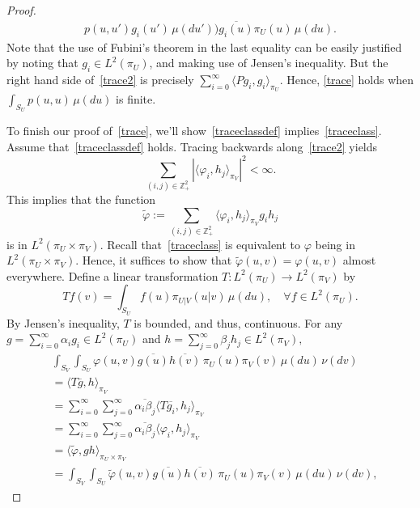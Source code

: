 \documentclass[11pt]{article}
\begin{document}
\begin{proof}
\begin{equation}
\begin{aligned}
                  p(u,u') g_i(u') \, \mu(du') \Big) \overline{g_i(u)}
                  \pi_U(u) \, \mu(du).
		\end{aligned}
		\end{equation}
		Note that the use of Fubini's theorem in the last
                equality can be easily justified by noting that $g_i
                \in L^2(\pi_U)$, and making use of Jensen's
                inequality.  But the right hand side of~\eqref{trace2}
                is precisely $\sum_{i=0}^{\infty} \langle P g_i, g_i
                \rangle_{\pi_U}.$ Hence, \eqref{trace} holds when
                $\int_{S_U} p(u,u) \, \mu(du)$ is finite.
		
		To finish our proof of~\eqref{trace}, we'll
                show~\eqref{traceclassdef}
                implies~\eqref{traceclass}. Assume
                that~\eqref{traceclassdef} holds. Tracing backwards
                along~\eqref{trace2} yields
		\[
		\sum_{(i,j) \in \mathbb{Z}_+^2} |\langle \varphi_i, h_j \rangle_{\pi_V}|^2 < \infty.
		\]
		This implies that the function
		\[
		\tilde{\varphi} := \sum_{(i,j) \in \mathbb{Z}_+^2} \langle \varphi_i, h_j \rangle_{\pi_V} g_i h_j
		\]
		is in $L^2(\pi_{U} \times \pi_V).$ Recall
                that~\eqref{traceclass} is equivalent to $\varphi$
                being in $L^2(\pi_{U} \times \pi_V).$ Hence, it
                suffices to show that $\tilde{\varphi}(u,v) =
                \varphi(u,v)$ almost everywhere. Define a linear
                transformation $T: L^2(\pi_U) \to L^2(\pi_V)$ by
		\[
		Tf(v) = \int_{S_U} f(u) \pi_{U|V}(u|v) \, \mu(du), \quad \forall f \in L^2(\pi_U).
		\]
		By Jensen's inequality, $T$ is bounded, and thus, continuous. For any $g = \sum_{i=0}^{\infty} \alpha_i g_i \in L^2(\pi_{U})$ and $h = \sum_{j=0}^{\infty} \beta_j h_j \in L^2(\pi_{V}),$
		\[
		\begin{aligned}
		&\int_{S_V} \int_{S_U} \varphi(u,v) \overline{g(u)} \overline{h(v)} \, \pi_U(u)\pi_V(v) \, \mu(du) \, \nu(dv) \\
		&= \langle T \overline{g}, h \rangle_{\pi_V} \\
		&= \sum_{i=0}^{\infty} \sum_{j=0}^{\infty} \overline{\alpha_i \beta_j} \langle T \overline{g_i}, h_j \rangle_{\pi_V} \\
		&= \sum_{i=0}^{\infty} \sum_{j=0}^{\infty} \overline{\alpha_i \beta_j} \langle \varphi_i, h_j \rangle_{\pi_V} \\
		&= \langle \tilde{\varphi}, g h \rangle_{\pi_U\times\pi_V} \\
		&= \int_{S_V} \int_{S_U} \tilde{\varphi}(u,v) \overline{g(u)} \overline{h(v)} \, \pi_U(u)\pi_V(v) \, \mu(du) \, \nu(dv),

\end{aligned}\]
\end{proof}
\end{document}
